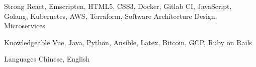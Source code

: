 

\begin{cvskills}

  \cvskill
    {Strong} %
    {React, Emscripten, HTML5, CSS3, Docker, Gitlab CI, JavaScript, Golang, Kubernetes, AWS, Terraform, Software Architecture Design, Microservices} %

  \cvskill
    {Knowledgeable} %
    {Vue, Java, Python, Ansible, Latex, Bitcoin, GCP, Ruby on Rails} %

  \cvskill
    {Languages} %
    {Chinese, English} %

\end{cvskills}
